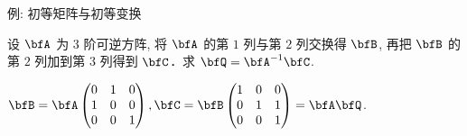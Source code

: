 \begin{frame}{例: 初等矩阵与初等变换}
	\onslide<+->
	\begin{example}
		设 $\bfA$ 为 $3$ 阶可逆方阵, 将 $\bfA$ 的第 $1$ 列与第 $2$ 列交换得 $\bfB$, 再把 $\bfB$ 的第 $2$ 列加到第 $3$ 列得到 $\bfC$．求 $\bfQ=\bfA^{-1}\bfC$.
	\end{example}
	\onslide<+->
	\begin{solution}
		$\bfB=\bfA\begin{pmatrix}
			0&1&0\\1&0&0\\0&0&1
		\end{pmatrix},\bfC=\bfB\begin{pmatrix}
			1&0&0\\0&1&1\\0&0&1
		\end{pmatrix}=\bfA\bfQ$.
		\onslide<+->{因此
		\[\bfQ=\begin{pmatrix}
			0&1&0\\1&0&0\\0&0&1
		\end{pmatrix}\begin{pmatrix}
			1&0&0\\0&1&1\\0&0&1
		\end{pmatrix}=\begin{pmatrix}
			0&1&1\\1&0&0\\0&0&1
		\end{pmatrix}.\]}
	\end{solution}
\end{frame}


